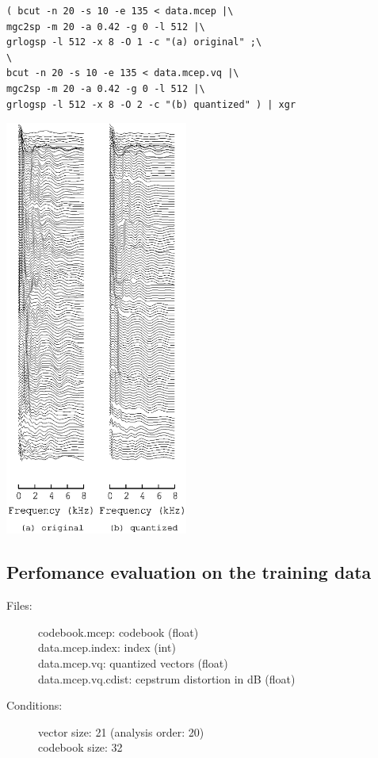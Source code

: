 \documentclass[a4paper,10pt]{article}
\begin{document}
\begin{verbatim}
( bcut -n 20 -s 10 -e 135 < data.mcep |\
mgc2sp -m 20 -a 0.42 -g 0 -l 512 |\
grlogsp -l 512 -x 8 -O 1 -c "(a) original" ;\
\
bcut -n 20 -s 10 -e 135 < data.mcep.vq |\
mgc2sp -m 20 -a 0.42 -g 0 -l 512 |\
grlogsp -l 512 -x 8 -O 2 -c "(b) quantized" ) | xgr
\end{verbatim}

\includegraphics[width=6cm]{data.mcep.vq.grlogsp.eps}

\subsection{Perfomance evaluation on the training data}

\begin{description}
\item[Files:]
   codebook.mcep: codebook (float)\\
   data.mcep.index: index (int)\\
   data.mcep.vq: quantized vectors (float)\\
   data.mcep.vq.cdist: cepstrum distortion in dB (float)
\item[Conditions:]
   vector size: 21 (analysis order: 20)\\
   codebook size: 32
\end{description}
\end{document}
